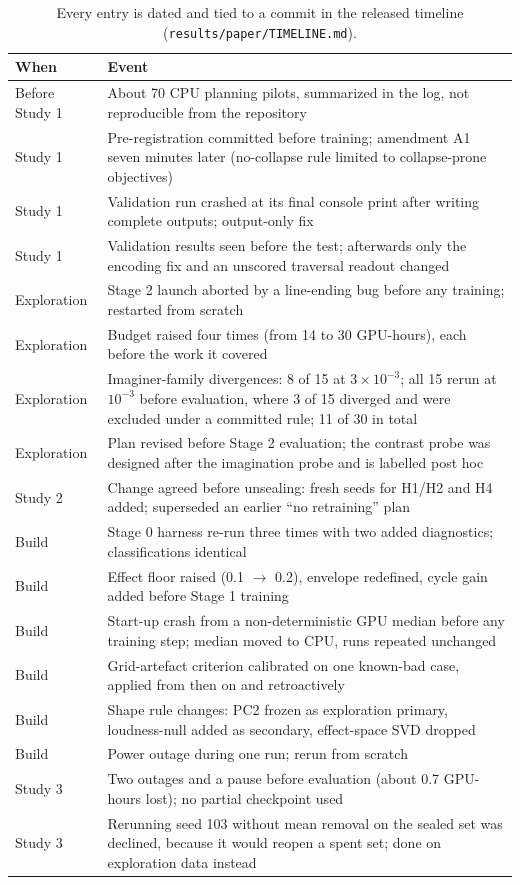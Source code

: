\documentclass[10pt]{article}
\begin{document}
\begin{table}[htbp]
\centering
\small
\caption{Every entry is dated and tied to a commit in the released timeline (\texttt{results/paper/TIMELINE.md}).}
\label{tab:F1}
\begin{tabularx}{\linewidth}{l>{\raggedright\arraybackslash}X}
\toprule
When & Event \\
\midrule
Before Study 1 & About 70 CPU planning pilots, summarized in the log, not reproducible from the repository \\
Study 1 & Pre-registration committed before training; amendment A1 seven minutes later (no-collapse rule limited to collapse-prone objectives) \\
Study 1 & Validation run crashed at its final console print after writing complete outputs; output-only fix \\
Study 1 & Validation results seen before the test; afterwards only the encoding fix and an unscored traversal readout changed \\
Exploration & Stage 2 launch aborted by a line-ending bug before any training; restarted from scratch \\
Exploration & Budget raised four times (from 14 to 30 GPU-hours), each before the work it covered \\
Exploration & Imaginer-family divergences: 8 of 15 at $3\times10^{-3}$; all 15 rerun at $10^{-3}$ before evaluation, where 3 of 15 diverged and were excluded under a committed rule; 11 of 30 in total \\
Exploration & Plan revised before Stage 2 evaluation; the contrast probe was designed after the imagination probe and is labelled post hoc \\
Study 2 & Change agreed before unsealing: fresh seeds for H1/H2 and H4 added; superseded an earlier ``no retraining'' plan \\
Build & Stage 0 harness re-run three times with two added diagnostics; classifications identical \\
Build & Effect floor raised (0.1 $\rightarrow$ 0.2), envelope redefined, cycle gain added before Stage 1 training \\
Build & Start-up crash from a non-deterministic GPU median before any training step; median moved to CPU, runs repeated unchanged \\
Build & Grid-artefact criterion calibrated on one known-bad case, applied from then on and retroactively \\
Build & Shape rule changes: PC2 frozen as exploration primary, loudness-null added as secondary, effect-space SVD dropped \\
Build & Power outage during one run; rerun from scratch \\
Study 3 & Two outages and a pause before evaluation (about 0.7 GPU-hours lost); no partial checkpoint used \\
Study 3 & Rerunning seed 103 without mean removal on the sealed set was declined, because it would reopen a spent set; done on exploration data instead \\
\bottomrule
\end{tabularx}
\end{table}
\end{document}

